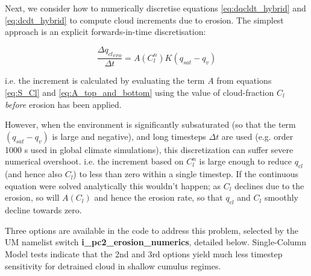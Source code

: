 \documentclass{UMDP_article}
\begin{document}
Next, we consider how to numerically discretise equations
\ref{eq:dqcldt_hybrid} and \ref{eq:dcdt_hybrid}
to compute cloud increments due to erosion.
The simplest approach is an explicit forwards-in-time discretisation:

\begin{equation}
\frac{ \Delta {q_{cl}}_{ero}}{\Delta t} = A(C_l^n) K(q_{sat}-q_v)
\label{eq:hybrid_erosion_expl} \end{equation}

i.e. the increment is calculated by evaluating the term $A$ from equations
\ref{eq:S_Cl} and \ref{eq:A_top_and_bottom} using the value of cloud-fraction
$C_l$ \textit{before} erosion has been applied.

However, when the environment is significantly subsaturated
(so that the term $(q_{sat}-q_v)$ is large and negative),
and long timesteps $\Delta t$ are used
(e.g. order 1000 s used in global climate simulations),
this discretization can suffer severe numerical overshoot.
i.e. the increment based on $C_l^n$ is large enough to reduce $q_{cl}$
(and hence also $C_l$) to less than zero within a single timestep.
If the continuous equation were solved analytically this wouldn't happen;
as $C_l$ declines due to the erosion, so will $A(C_l)$
and hence the erosion rate, so that $q_{cl}$ and $C_l$ smoothly decline
towards zero.

Three options are available in the code to address this problem,
selected by the UM namelist switch \textbf{i\_pc2\_erosion\_numerics},
detailed below.
Single-Column Model tests indicate that the 2nd and 3rd options yield much less
timestep sensitivity for detrained cloud in shallow cumulus regimes.
\end{document}
